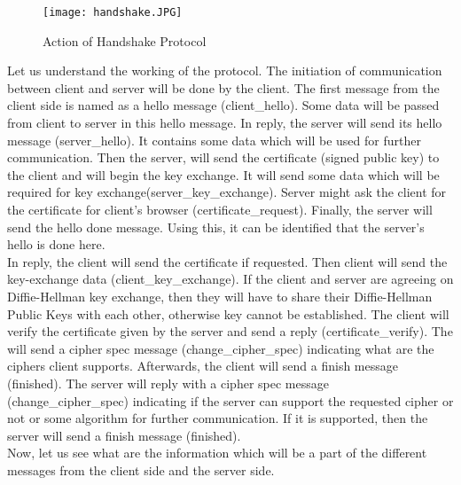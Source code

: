 \documentclass[11pt]{article}
\begin{document}
\begin{figure}[htbp]
   \centering
   \texttt{[image: handshake.JPG]}
   \caption{Action of Handshake Protocol}   
\end{figure}

Let us understand the working of the protocol. The initiation of communication between client and server will be done by the client. The first message from the client side is named as a hello message (client\_hello). Some data will be passed from client to server in this hello message. In reply, the server will send its hello message (server\_hello). It contains some data which will be used for further communication. Then the server, will send the certificate (signed public key) to the client and will begin the key exchange. It will send some data which will be required for key exchange(server\_key\_exchange). Server might ask the client for the certificate for client's browser (certificate\_request). Finally, the server will send the hello done message. Using this, it can be identified that the server's hello is done here.\\
\newline
In reply, the client will send the certificate if requested. Then client will send the key-exchange data (client\_key\_exchange). If the client and server are agreeing on Diffie-Hellman key exchange, then they will have to share their Diffie-Hellman Public Keys with each other, otherwise key cannot be established. The client will verify the certificate given by the server and send a reply (certificate\_verify). The will send a cipher spec message (change\_cipher\_spec) indicating what are the ciphers client supports. Afterwards, the client will send a finish message (finished). The server will reply with a cipher spec message (change\_cipher\_spec) indicating if the server can support the requested cipher or not or some algorithm for further communication. If it is supported, then the server will send a finish message (finished).\\
\newline
Now, let us see what are the information which will be a part of the different messages from the client side and the server side.
\end{document}
